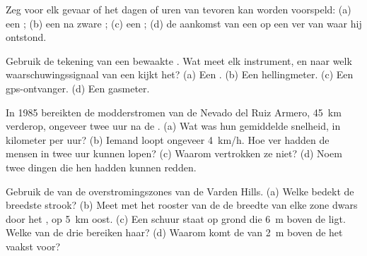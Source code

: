 \begin{exercise}[$\star$]\label{exo:g9:natural-risks:3}
Zeg voor elk gevaar of het dagen of uren van tevoren kan worden voorspeld:
(a) een ; (b) een  na zware ; (c) een ;
(d) de aankomst van een  op een  ver van waar hij ontstond.
\end{exercise}

\begin{exercise}[$\star$]\label{exo:g9:natural-risks:4}
Gebruik de tekening van een bewaakte . Wat meet elk instrument, en
naar welk waarschuwingssignaal van een  kijkt het? (a) Een
. (b) Een hellingmeter. (c) Een gps-ontvanger. (d) Een
gasmeter.
\end{exercise}

\begin{exercise}[$\star\star$]\label{exo:g9:natural-risks:5}
In 1985 bereikten de modderstromen van de Nevado del Ruiz Armero,
\qty{45}{km} verderop, ongeveer twee uur na de . (a) Wat was hun
gemiddelde snelheid, in kilometer per uur? (b) Iemand loopt ongeveer
\qty{4}{km/h}. Hoe ver hadden de mensen in twee uur kunnen lopen?
(c) Waarom vertrokken ze niet? (d) Noem twee dingen die hen hadden kunnen
redden.
\end{exercise}

\begin{exercise}[$\star\star$]\label{exo:g9:natural-risks:6}
Gebruik de  van de overstromingszones van de Varden Hills.
(a) Welke  bedekt de breedste strook? (b) Meet met het rooster
van de  de breedte van elke zone dwars door het , op
\qty{5}{km} oost. (c) Een schuur staat op grond die \qty{6}{m} boven de
 ligt.
Welke van de drie  bereiken haar? (d) Waarom komt de
 van \qty{2}{m} boven de  het vaakst voor?
\end{exercise}

